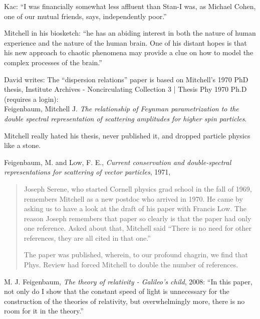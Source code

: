 \begin{description}
Kac: ``I was financially somewhat less affluent than Stan-I was, as
Michael Cohen, one of our mutual friends, says, independently poor.''

Mitchell in his biosketch: ``he has an abiding interest in both the
nature of human experience and the nature of the human brain. One of his
distant hopes is that his new approach to chaotic phenomena may provide a
clue on how to model the complex processes of the brain.''

\medskip

David writes:
The ``dispersion relations'' paper is
based on Mitchell’s 1970 PhD thesis,
Institute Archives - Noncirculating Collection 3 |
{Thesis Phy 1970 Ph.D}
(requires a login):
\\
Feigenbaum, Mitchell J.
{\em The relationship of Feynman parametrization to the double spectral
representation of scattering amplitudes for higher spin particles}.

Mitchell really hated his thesis, never published it, and dropped
particle physics like a stone.

{Feigenbaum, M. and Low, F. E.},
  {\em Current conservation and double-spectral representations for scattering of vector particles},
{1971},
\begin{quote}
Joseph Serene, who started Cornell physics grad school in the fall of 1969,
remembers Mitchell as a new postdoc who arrived in
1970. He came by asking us to have a look at the draft of his paper with
{Francis Low}.
The reason Joseph remembers that paper so clearly is that the paper had
only one reference. Asked about that, Mitchell said ``There is no need for
other references, they are all cited in that one.''

The paper was published, wherein, to our profound chagrin,
we find that Phys. Review had forced Mitchell to double the number of
references.
\end{quote}

{M. J. Feigenbaum},
{\em The theory of relativity - {Galileo's} child},
{2008}:
``In this paper, not only do I show that the constant speed of light is
unnecessary for the construction of the theories of relativity, but
overwhelmingly more, there is no room for it in the theory.''


\end{description}
